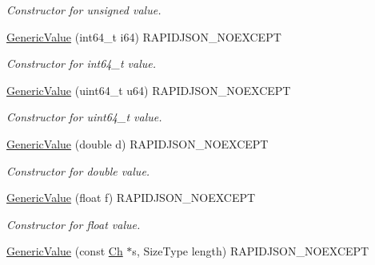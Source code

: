 \begin{DoxyCompactItemize}
\begin{DoxyCompactList}\small\item\em Constructor for unsigned value. \end{DoxyCompactList}\item 
\hyperlink{class_generic_value_a964b69f1d2596f75ded5421b6db01a14}{Generic\+Value} (int64\+\_\+t i64) R\+A\+P\+I\+D\+J\+S\+O\+N\+\_\+\+N\+O\+E\+X\+C\+E\+PT\hypertarget{class_generic_value_a964b69f1d2596f75ded5421b6db01a14}{}\label{class_generic_value_a964b69f1d2596f75ded5421b6db01a14}

\begin{DoxyCompactList}\small\item\em Constructor for int64\+\_\+t value. \end{DoxyCompactList}\item 
\hyperlink{class_generic_value_ad04805a57f5050c8e04be469ba64d6f3}{Generic\+Value} (uint64\+\_\+t u64) R\+A\+P\+I\+D\+J\+S\+O\+N\+\_\+\+N\+O\+E\+X\+C\+E\+PT\hypertarget{class_generic_value_ad04805a57f5050c8e04be469ba64d6f3}{}\label{class_generic_value_ad04805a57f5050c8e04be469ba64d6f3}

\begin{DoxyCompactList}\small\item\em Constructor for uint64\+\_\+t value. \end{DoxyCompactList}\item 
\hyperlink{class_generic_value_a267d05b7e98c3507908eaf085fe41155}{Generic\+Value} (double d) R\+A\+P\+I\+D\+J\+S\+O\+N\+\_\+\+N\+O\+E\+X\+C\+E\+PT\hypertarget{class_generic_value_a267d05b7e98c3507908eaf085fe41155}{}\label{class_generic_value_a267d05b7e98c3507908eaf085fe41155}

\begin{DoxyCompactList}\small\item\em Constructor for double value. \end{DoxyCompactList}\item 
\hyperlink{class_generic_value_acad11ab781251634a3c079aa64a6d283}{Generic\+Value} (float f) R\+A\+P\+I\+D\+J\+S\+O\+N\+\_\+\+N\+O\+E\+X\+C\+E\+PT\hypertarget{class_generic_value_acad11ab781251634a3c079aa64a6d283}{}\label{class_generic_value_acad11ab781251634a3c079aa64a6d283}

\begin{DoxyCompactList}\small\item\em Constructor for float value. \end{DoxyCompactList}\item 
\hyperlink{class_generic_value_a4d9af98141360cd801daab4ed1ca2c91}{Generic\+Value} (const \hyperlink{class_generic_value_ade0e0ce64ccd5d852da57a35e720bafb}{Ch} $\ast$s, Size\+Type length) R\+A\+P\+I\+D\+J\+S\+O\+N\+\_\+\+N\+O\+E\+X\+C\+E\+PT\hypertarget{class_generic_value_a4d9af98141360cd801daab4ed1ca2c91}{}\label{class_generic_value_a4d9af98141360cd801daab4ed1ca2c91}


\end{DoxyCompactItemize}
